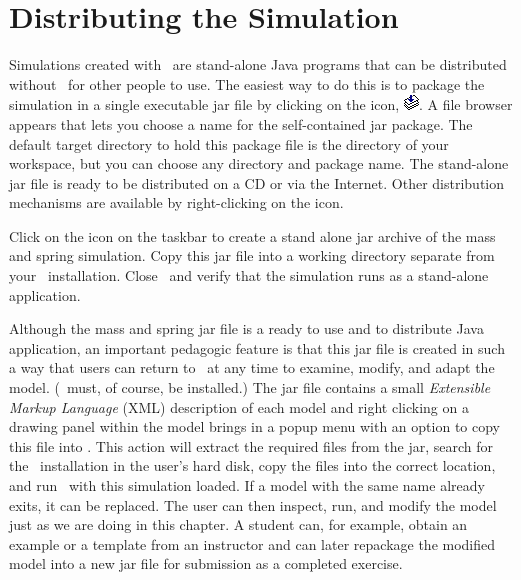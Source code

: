 \section{Distributing the Simulation}\label{section:02ExplorationJavaDistributing}
%
Simulations created with \ejs\ are stand-alone Java programs that can be distributed without \ejs\ for other people to use.  The easiest way to do this is to package the simulation in a single executable jar file by clicking on the  icon, \includegraphics[scale=\linescale]{../_common/icons_png/package.png}. A file browser appears that lets you choose a name for the self-contained jar package.  The default target directory to hold this package file is the  directory of your workspace, but you can choose any directory and package name. The stand-alone jar file is ready to be distributed on a CD or via the Internet.  Other distribution mechanisms are available by right-clicking on the icon.

\begin{exercise}\label{ex:02ExplorationJava/distribution}
Click on the  icon on the taskbar to create a stand alone jar archive of the mass and spring simulation.  Copy this jar file into a working directory separate from your \ejs\ installation.  Close \ejs\ and verify that the simulation runs as a stand-alone application.
\end{exercise}

Although the mass and spring jar file is a ready to use and to distribute Java application, an important pedagogic feature is that this jar file is created in such a way that users can return to \ejs\ at any time to examine, modify, and adapt the model. (\ejs\ must, of course, be installed.)  The jar file contains a small \emph{Extensible Markup Language} (XML) description of each model and right clicking on a drawing panel within the model brings in a popup menu with an option to copy this file into \ejs. This action will extract the required files from the jar, search for the \ejs\ installation in the user's hard disk, copy the files into the correct location, and run \ejs\ with this simulation loaded. If a model with the same name already exits, it can be replaced. The user can then inspect, run, and modify the model just as we are doing in this chapter.  A student can, for example, obtain an example or a template from an instructor and can later repackage the modified model into a new jar file for submission as a completed exercise.

